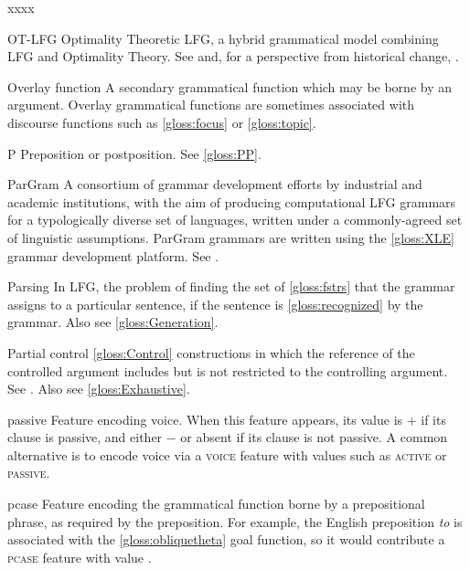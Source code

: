 \documentclass[output=paper,colorlinks,citecolor=brown]{langscibook}
\begin{document}
\begin{labeling}{xxxx}
\item[OT-LFG] Optimality Theoretic LFG, a hybrid grammatical model combining LFG and Optimality Theory. See  and, for a perspective from historical change, \citetv[\ref{sec:Historical:var}]{chapters/Historical}.

\item[Overlay function \namedlabel{gloss:overlay}{overlay function}\namedlabel{gloss:Overlay}{Overlay function}] A secondary grammatical function which may be borne by an argument.  Overlay grammatical functions are sometimes associated with discourse functions such as \ref{gloss:focus} or \ref{gloss:topic}.

\item[P] Preposition or postposition. See \ref{gloss:PP}.

\item[ParGram\namedlabel{gloss:PARGRAM}{ParGram}] A consortium of grammar development efforts by industrial and academic institutions, with the aim of producing computational LFG grammars for a typologically diverse set of languages, written under a commonly-agreed set of linguistic assumptions.  ParGram grammars are written using the \ref{gloss:XLE} grammar development platform.  See \citetv[\ref{sec:pargram}]{chapters/ImplementationsApplications}.

\item[Parsing\namedlabel{gloss:parsing}{parsing}\namedlabel{gloss:Parsing}{Parsing}] In LFG, the problem of finding the set of \ref{gloss:fstrs} that the grammar assigns to a particular sentence, if the sentence is \ref{gloss:recognized} by the grammar.  Also see \ref{gloss:Generation}.

\item[Partial control\namedlabel{gloss:partial}{partial}\namedlabel{gloss:Partial}{Partial control}] \ref{gloss:Control} constructions in which the reference of the controlled argument includes but is not restricted to the controlling argument. See .  Also see \ref{gloss:Exhaustive}.
  
\item[passive] Feature encoding voice. When this feature appears, its value is $+$ if its clause is passive, and either $-$ or absent if its clause is not passive.  A common alternative is to encode voice via a \textsc{voice} feature with values such as \textsc{active} or \textsc{passive}.

\item[pcase] Feature encoding the grammatical function borne by a prepositional phrase, as required by the preposition.  For example, the English preposition \emph{to} is associated with the \ref{gloss:obliquetheta} goal function, so it would contribute a \textsc{pcase} feature with value .


\end{labeling}
\end{document}
